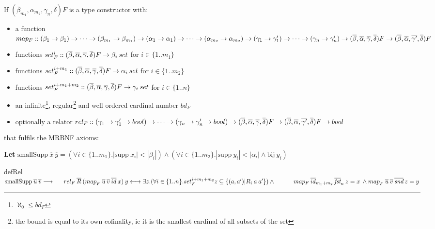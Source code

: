 \begin{definition}[\ac{MRBNF}]
If $(\overline{\beta}_{m_1}, \overline{\alpha}_{m_2}, \overline{\gamma}_n, \overline{\delta}) F$ is a type constructor with:
\begin{itemize}
\item{a function $map_F :: (\beta_1 \to \beta_1) \to \dots \to (\beta_{m_1} \to \beta_{m_1}) \to (\alpha_1 \to \alpha_1) \to \dots \to (\alpha_{m_2} \to \alpha_{m_2}) \to (\gamma_1 \to \gamma'_1) \to \dots \to (\gamma_n \to \gamma'_n) \to (\overline{\beta}, \overline{\alpha}, \overline{\gamma}, \overline{\delta}) F \to (\overline{\beta}, \overline{\alpha}, \overline{\gamma'}, \overline{\delta}) F$}
\item{functions $set_F^i :: (\overline{\beta}, \overline{\alpha}, \overline{\gamma}, \overline{\delta}) F \to \beta_i \: set$ for $i \in \{1 .. m_1\}$}
\item{functions $set_F^{i+m_1} :: (\overline{\beta}, \overline{\alpha}, \overline{\gamma}, \overline{\delta}) F \to \alpha_i \: set$ for $i \in \{1 .. m_2\}$}
\item{functions $set_F^{i+m_1+m_2} :: (\overline{\beta}, \overline{\alpha}, \overline{\gamma}, \overline{\delta}) F \to \gamma_i \: set$ for $i \in \{1 .. n\}$}
\item{an infinite\footnote{$\aleph_0 \le bd_F$}, regular\footnote{the bound is equal to its own cofinality, ie it is the smallest cardinal of all subsets of the set\label{ftn:regular}} and well-ordered cardinal number $bd_F$}
\item{optionally a relator $rel_F :: (\gamma_1 \to \gamma'_1 \to bool) \to \dots \to (\gamma_n \to \gamma'_n \to bool) \to (\overline{\beta}, \overline{\alpha}, \overline{\gamma}, \overline{\delta}) F \to (\overline{\beta}, \overline{\alpha}, \overline{\gamma'}, \overline{\delta}) F \to bool$}
\end{itemize}

that fulfils the \ac{MRBNF} axioms:
\vspace{1em}

\textbf{Let} $\text{smallSupp} \: \overline{x} \: \overline{y} = (\forall i \in \{1..m_1\}. |\text{supp} \: x_i| < |\beta_i|) \wedge (\forall i \in \{1..m_2\}. |\text{supp} \: y_i| < |\alpha_i| \wedge \text{bij} \: y_i)$

\newcommand{\mapF}[3]{\map{F}{#1}{#2}{#3}}
\newcommand{\relF}[3]{rel_F \: \overline{#1} \: \overline{#2} \: \overline{#3}}

\begin{axiom}{defRel}\label{ax:def_rel}
$\smallSupp{u}{v} \longrightarrow \\
\ms rel_F \: \overline{R} \: (\map{F}{u}{v}{id} \: x) \: y \longleftrightarrow \exists z. (\forall i \in \{1..n\}. set_F^{i+m_1+m_2} z \subseteq \{(a, a') | R_i \: a \: a' \}) \wedge \\*
\ms \ms map_F \: \overline{id}_{m_1+m_2} \: \overline{\textit{fst}}_n \: z = x \: \wedge \mapF{u}{v}{\textit{snd}} \: z = y
$
\end{axiom}


\end{definition}

